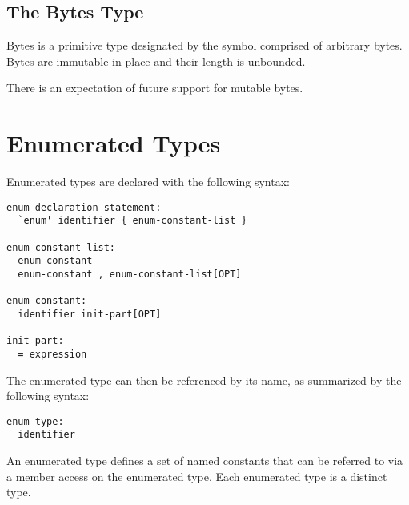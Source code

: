 \subsection{The Bytes Type}
\label{The_Bytes_Type}

Bytes is a primitive type designated by the symbol  comprised of
arbitrary bytes. Bytes are immutable in-place and their length is unbounded.

\begin{openissue}
There is an expectation of future support for mutable bytes.
\end{openissue}

\section{Enumerated Types}
\label{Enumerated_Types}

Enumerated types are declared with the following syntax:

\begin{syntax}
\begin{verbatim}
enum-declaration-statement:
  `enum' identifier { enum-constant-list }

enum-constant-list:
  enum-constant
  enum-constant , enum-constant-list[OPT]

enum-constant:
  identifier init-part[OPT]

init-part:
  = expression
\end{verbatim}
\end{syntax}

The enumerated type can then be referenced by its name, as summarized
by the following syntax:

\begin{syntax}
\begin{verbatim}
enum-type:
  identifier
\end{verbatim}
\end{syntax}

An enumerated type defines a set of named constants that can be
referred to via a member access on the enumerated type.
Each enumerated type is a distinct type.

